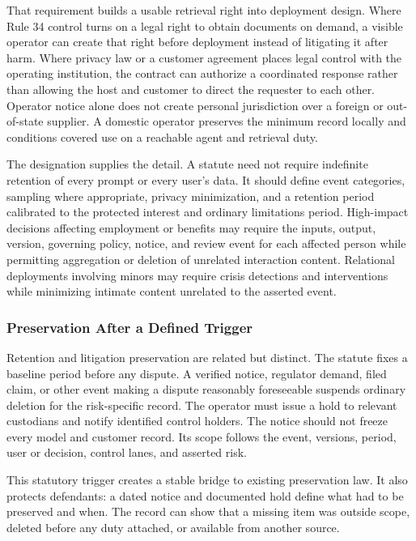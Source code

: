 That requirement builds a usable retrieval right into deployment design. Where Rule 34 control turns on a legal right to obtain documents on demand, a visible operator can create that right before deployment instead of litigating it after harm. Where privacy law or a customer agreement places legal control with the operating institution, the contract can authorize a coordinated response rather than allowing the host and customer to direct the requester to each other. Operator notice alone does not create personal jurisdiction over a foreign or out-of-state supplier. A domestic operator preserves the minimum record locally and conditions covered use on a reachable agent and retrieval duty.

The designation supplies the detail. A statute need not require indefinite retention of every prompt or every user's data. It should define event categories, sampling where appropriate, privacy minimization, and a retention period calibrated to the protected interest and ordinary limitations period. High-impact decisions affecting employment or benefits may require the inputs, output, version, governing policy, notice, and review event for each affected person while permitting aggregation or deletion of unrelated interaction content. Relational deployments involving minors may require crisis detections and interventions while minimizing intimate content unrelated to the asserted event.

\subsubsection{Preservation After a Defined Trigger}

Retention and litigation preservation are related but distinct. The statute fixes a baseline period before any dispute. A verified notice, regulator demand, filed claim, or other event making a dispute reasonably foreseeable suspends ordinary deletion for the risk-specific record. The operator must issue a hold to relevant custodians and notify identified control holders. The notice should not freeze every model and customer record. Its scope follows the event, versions, period, user or decision, control lanes, and asserted risk.

This statutory trigger creates a stable bridge to existing preservation law. It also protects defendants: a dated notice and documented hold define what had to be preserved and when. The record can show that a missing item was outside scope, deleted before any duty attached, or available from another source.

